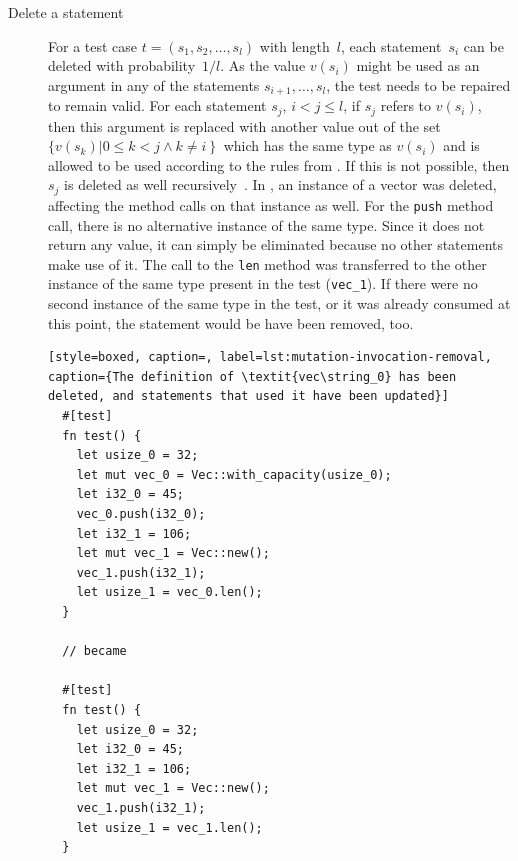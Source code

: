 \documentclass[paper=a4,%
  twoside,%
  BCOR4mm,%
  abstract=true,%
  toc=bibliography,%
  chapterprefix=true,%
  toc=bibliographynumbered,%
  open=right,%
  english,%
  pagesize=pdftex]{scrreprt}
\begin{document}
\begin{description}
  \item[Delete a statement] For a test case $t = (s_1, s_2, \dots, s_l)$ with length~$l$, each statement~$s_i$ can be deleted with probability~$1/l$. As the value $v(s_i)$ might be used as an argument in any of the statements $s_{i+1}, \dots, s_l$, the test needs to be repaired to remain valid. For each statement $s_j$, $i < j \leq l$, if $s_j$ refers to $v(s_i)$, then this argument is replaced with another value out of the set $\{v(s_k) \left| 0 \leq k < j \wedge k \neq i \right\}$ which has the same type as $v(s_i)$ and is allowed to be used according to the rules from . If this is not possible, then $s_j$ is deleted as well recursively~\cite{Fraser2012}. In , an instance of a vector was deleted, affecting the method calls on that instance as well. For the \texttt{push} method call, there is no alternative instance of the same type. Since it does not return any value, it can simply be eliminated because no other statements make use of it. The call to the \texttt{len} method was transferred to the other instance of the same type present in the test (\texttt{vec\string_1}). If there were no second instance of the same type in the test, or it was already consumed at this point, the statement would be have been removed, too.

  \begin{lstlisting}[style=boxed, caption=, label=lst:mutation-invocation-removal, caption={The definition of \textit{vec\string_0} has been deleted, and statements that used it have been updated}]
  #[test]
  fn test() {
    let usize_0 = 32;
    let mut vec_0 = Vec::with_capacity(usize_0);
    let i32_0 = 45;
    vec_0.push(i32_0);
    let i32_1 = 106;
    let mut vec_1 = Vec::new();
    vec_1.push(i32_1);
    let usize_1 = vec_0.len();
  }

  // became

  #[test]
  fn test() {
    let usize_0 = 32;
    let i32_0 = 45;
    let i32_1 = 106;
    let mut vec_1 = Vec::new();
    vec_1.push(i32_1);
    let usize_1 = vec_1.len();
  }
  \end{lstlisting}

\end{description}
\end{document}

